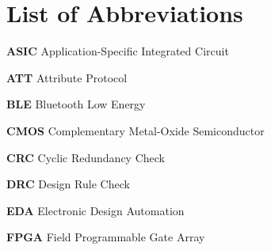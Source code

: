 \documentclass[12pt,singleside,a4paper]{report}
\begin{document}
{}
\listoftables





 
 

\chapter*{List of Abbreviations}



\noindent \textbf{ASIC} \quad Application-Specific Integrated Circuit

\noindent \textbf{ATT} \quad Attribute Protocol

\noindent \textbf{BLE} \quad Bluetooth Low Energy

\noindent \textbf{CMOS} \quad Complementary Metal-Oxide Semiconductor

\noindent \textbf{CRC} \quad Cyclic Redundancy Check

\noindent \textbf{DRC} \quad Design Rule Check

\noindent \textbf{EDA} \quad Electronic Design Automation

\noindent \textbf{FPGA} \quad Field Programmable Gate Array
\end{document}
